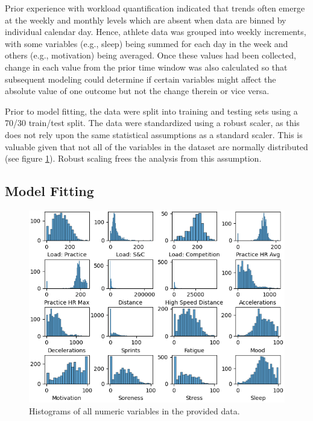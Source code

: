 \documentclass{article}
\begin{document}
			Prior experience with workload quantification indicated
			that trends often emerge at the weekly and monthly levels
			which are absent when data are binned by individual calendar day.
			Hence, athlete data was grouped into weekly increments,
			with some variables (e.g., sleep) being summed for each
			day in the week and others (e.g., motivation) being averaged.
			Once these values had been collected, change in each value
			from the prior time window was also calculated so that
			subsequent modeling could determine if certain variables
			might affect the absolute value of one outcome but not
			the change therein or vice versa.

			Prior to model fitting, the data were split into training
			and testing sets using a 70/30 train/test split. The
			data were standardized using a robust scaler, as this does
			not rely upon the same statistical assumptions as a standard
			scaler. This is valuable given that not all of the variables
			in the dataset are normally distributed
			(see figure \ref{fig:eda_hist_all}). Robust scaling frees
			the analysis from this assumption.

		\subsection{Model Fitting}

			\begin{figure}
			\end{figure}

			\begin{figure}
				\begin{center}
					\includegraphics{../images/eda/eda_hist_all}
				\end{center}
				\caption{Histograms of all numeric variables in the provided data.}
				\label{fig:eda_hist_all}
			\end{figure}
\end{document}
